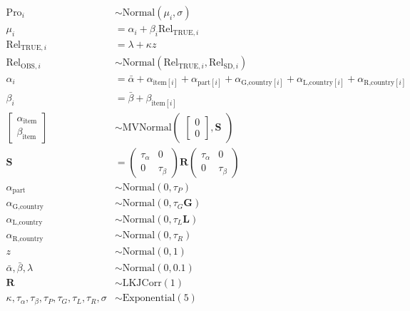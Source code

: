 \documentclass[
  man,floatsintext]{apa6}
\begin{document}
\[
\begin{aligned}
\text{Pro}_{i} &\sim \text{Normal}(\mu_{i},\sigma) \\
\mu_{i} &= \alpha_{i} + \beta_{i}\text{Rel}_{\text{TRUE},i} \\
\text{Rel}_{\text{TRUE},i} &= \lambda + \kappa z \\
\text{Rel}_{\text{OBS},i} &\sim \text{Normal}(\text{Rel}_{\text{TRUE},i}, \text{Rel}_{\text{SD},i}) \\
\alpha_{i} &= \bar{\alpha} + \alpha_{\text{item}[i]} + \alpha_{\text{part}[i]} + \alpha_{\text{G,country}[i]} + \alpha_{\text{L,country}[i]} + \alpha_{\text{R,country}[i]} \\
\beta_{i} &= \bar{\beta} + \beta_{\text{item}[i]} \\
\begin{bmatrix}\alpha_{\text{item}}\\
\beta_{\text{item}}\end{bmatrix} &\sim \text{MVNormal}
\begin{pmatrix}\begin{bmatrix}0\\0\end{bmatrix},\textbf{S}
\end{pmatrix}\\
\textbf{S} &=
\begin{pmatrix}\tau_{\alpha}&0\\0&\tau_{\beta}\end{pmatrix}
\textbf{R}
\begin{pmatrix}\tau_{\alpha}&0\\0&\tau_{\beta}\end{pmatrix} \\
\alpha_{\text{part}} &\sim \text{Normal}(0, \tau_{P}) \\
\alpha_{\text{G,country}} &\sim \text{Normal}(0, \tau_{G} \textbf{G}) \\
\alpha_{\text{L,country}} &\sim \text{Normal}(0, \tau_{L} \textbf{L}) \\
\alpha_{\text{R,country}} &\sim \text{Normal}(0, \tau_{R}) \\
z &\sim \text{Normal}(0, 1)\\
\bar{\alpha},\bar{\beta},\lambda &\sim \text{Normal}(0, 0.1) \\
\textbf{R} &\sim \text{LKJCorr}(1)\\
\kappa,\tau_{\alpha},\tau_{\beta},\tau_{P},\tau_{G},\tau_{L},\tau_{R},\sigma &\sim \text{Exponential}(5)
\end{aligned}
\]
\newpage
\end{document}
